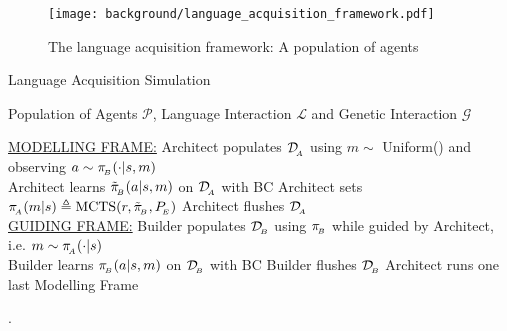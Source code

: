 \begin{figure}[!h]
\centering
\texttt{[image: background/language\_acquisition\_framework.pdf]}	
\caption{The language acquisition framework: A population of agents}
\label{fig:language_acquisition_framework}
\end{figure}




\begin{algorithm}[!h]
    \begin{algorithmic}
        \caption{\label{alg:langage-acquisition}Language Acquisition Simulation}
      
        \REQUIRE Population of Agents $\mathcal{P}$, Language Interaction $\mathcal{L}$ and Genetic Interaction $\mathcal{G}$
        
        
        \STATE\underline{MODELLING FRAME:}
        \bindent
                \STATE Architect populates $\mathcal{D}_{\!_A}$ using $m \sim$ Uniform() and observing $a\sim \pi_{\!_B}(\cdot|s,m)$\\
            \ENDFOR
            \STATE Architect learns $\tilde{\pi}_{\!_B}(a|s,m)$ on $\mathcal{D}_{\!_A}$ with BC
            \STATE
            Architect sets $\pi_{\!_A}(m|s) \triangleq \text{MCTS}(r, \tilde{\pi}_{\!_B}, P_{\!_E})$
            \STATE
            Architect flushes $\mathcal{D}_{\!_A}$
            \eindent\\
            \underline{GUIDING FRAME:}
            \bindent
                \STATE Builder populates $\mathcal{D}_{\!_B}$ using $\pib$ while guided by Architect, i.e.  $m \sim \pi_{\!_A}(\cdot|s)$\\
            \ENDFOR
            \STATE Builder learns $\pi_{\!_B}(a|s,m)$ on $\mathcal{D}_{\!_B}$ with BC
            \STATE Builder flushes $\mathcal{D}_{\!_B}$
            \eindent
        \ENDFOR
        \STATE Architect runs one last Modelling Frame\\
    \KwResult{$\pia$, $\pib$}
    \end{algorithmic}
\end{algorithm}

.

